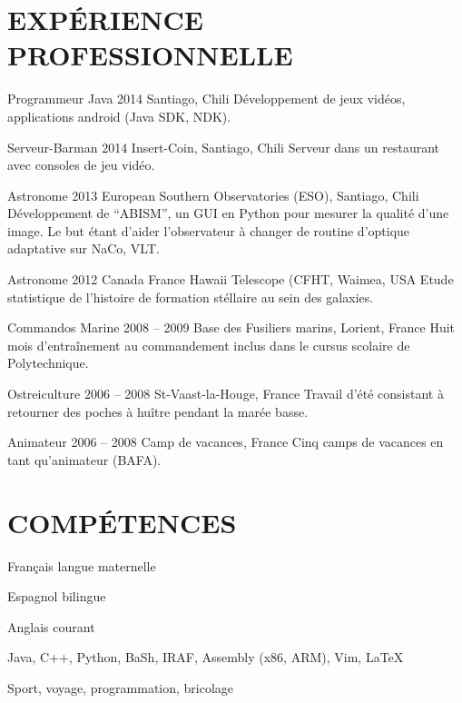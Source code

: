 \documentclass[paper=a4, fontsize=11pt, french]{old_school}
\newcommand{\tbfpart}[1]{\section*{\uppercase{#1}}}
\begin{document}
\tbfpart{Expérience Professionnelle}{}
\begin{joblist}
\item[Programmeur Java]{2014}
	{Santiago, Chili}
	{Développement de jeux vidéos, applications android (Java SDK, NDK).}


\item[Serveur-Barman]{2014}
	{Insert-Coin, Santiago, Chili}
	{Serveur dans un restaurant avec consoles de jeu vidéo.}


\item[Astronome]{2013}
	{European Southern Observatories (ESO), Santiago, Chili}
	{Développement de ``ABISM'', un GUI en Python pour mesurer la qualité d'une image.
 	Le but étant d'aider l'observateur à changer de routine d'optique adaptative sur NaCo, VLT.}


\item[Astronome]{2012}
	{Canada France Hawaii Telescope (CFHT, Waimea, USA}
	{Etude statistique de l'histoire de formation stéllaire au sein des galaxies.}


\item[Commandos Marine]{2008 -- 2009}
	{Base des Fusiliers marins, Lorient, France}
	{Huit mois d'entraînement au commandement inclus dans le cursus scolaire de Polytechnique.}


\item[Ostreiculture]{2006 -- 2008}
	{St-Vaast-la-Houge, France}
	{Travail d'été consistant à retourner des poches à huître pendant la marée basse.}


\item[Animateur]{2006 -- 2008}
	{Camp de vacances, France}
	{Cinq camps de vacances en tant qu'animateur (BAFA).}

\end{joblist}



\tbfpart{Compétences}

\begin{languagelist}
\item{Français}	{langue maternelle}
\item{Espagnol}	{bilingue}
\item{Anglais}	{courant} 
\end{languagelist}


		Java,
		C++, 
		Python, 
		BaSh, 
		IRAF, 
		Assembly (x86, ARM), 
		Vim, 
		\LaTeX


	Sport, voyage, programmation, bricolage
\end{document}
